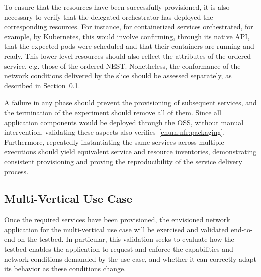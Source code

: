 To ensure that the resources have been successfully provisioned, it is also necessary to verify that the delegated orchestrator has deployed the corresponding resources. For instance, for containerized services orchestrated, for example, by Kubernetes, this would involve confirming, through its native \acs{API}, that the expected pods were scheduled and that their containers are running and ready. This lower level resources should also reflect the attributes of the ordered service, e.g. those of the ordered \acs{NEST}. Nonetheless, the conformance of the network conditions delivered by the slice should be assessed separately, as described in Section~\ref{chap:proposal:validation:use-case}.

A failure in any phase should prevent the provisioning of subsequent services, and the termination of the experiment should remove all of them. Since all application components would be deployed through the \acs{OSS}, without manual intervention, validating these aspects also verifies~\ref{enum:nfr:packaging}. Furthermore, repeatedly instantiating the same services across multiple executions should yield equivalent service and resource inventories, demonstrating consistent provisioning and proving the reproducibility of the service delivery process.

\subsection{Multi-Vertical Use Case}
\label{chap:proposal:validation:use-case}

Once the required services have been provisioned, the envisioned network application for the multi-vertical use case will be exercised and validated end-to-end on the testbed. In particular, this validation seeks to evaluate how the testbed enables the application to request and enforce the capabilities and network conditions demanded by the use case, and whether it can correctly adapt its behavior as these conditions change.

